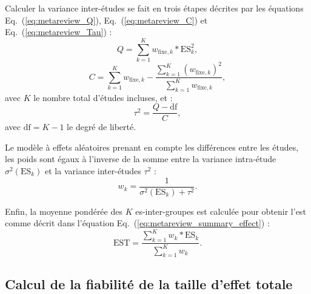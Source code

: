 Calculer la variance inter-études se fait en trois étapes décrites par les équations Eq.~(\ref{eq:metareview_Q}), Eq.~(\ref{eq:metareview_C}) 
et Eq.~(\ref{eq:metareview_Tau}) \citep[Chapitre~12]{Borenstein2009} :
\begin{equation}
\label{eq:metareview_Q}
Q = \sum_{k=1}^{K} w_{\text{fixe},k} * \text{ES}_k^2,
\end{equation}
\begin{equation}
\label{eq:metareview_C}
C = \sum_{k=1}^{K} w_{\text{fixe},k} - \frac{ \sum_{k=1}^{K} (w_{\text{fixe},k})^2 } { \sum_{k=1}^{K} w_{\text{fixe},k} },
\end{equation}
avec $K$ le nombre total d'études incluses, et :
\begin{equation}
\label{eq:metareview_Tau}
\tau^2 = \frac{Q - \text{df}}{C},
\end{equation}
avec $\text{df} = K - 1$ le degré de liberté.

Le modèle à effets aléatoires prenant en compte les différences entre les études, les poids sont égaux à l'inverse de la somme entre la variance intra-étude
$\sigma^2(\text{ES}_k)$ et la variance inter-études $\tau^2$ \citep[Chapitre~12]{Borenstein2009} :
\begin{equation}
\label{eq:metareview_weight_study}
w_k = \frac{1}{\sigma^2(\text{ES}_k) + \tau^2}.
\end{equation} 

Enfin, la moyenne pondérée des $K$ \gls{es}-inter-groupes est calculée pour obtenir l'\gls{est} comme décrit dans l'équation
Eq.~(\ref{eq:metareview_summary_effect}) \citep[Chapitre~12]{Borenstein2009}:
\begin{equation}
\label{eq:metareview_summary_effect}
\text{EST} = \frac{\sum_{k=1}^{K} w_k * \text{ES}_k} {\sum_{k=1}^{K} w_k}.
\end{equation} 

\subsection{Calcul de la fiabilité de la taille d'effet totale}

